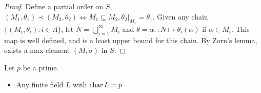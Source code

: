 \begin{theorem}
\begin{lemma}
\begin{proof}
      Define a partial order on $S$, $(M_1, \theta_1) \prec (M_2, \theta_2) \iff M_1 \subseteq M_2, \theta_2 \big|_{M_1} = \theta_1$.
      Given any chain $\{(M_i, \theta_i) : i \in \Lambda \}$, let $N = \bigcup_{i = 1}^\infty M_i$ and
      $\theta = \alpha :: N \mapsto \theta_i(\alpha)$ if $\alpha \in M_i$. This map is well defined, and is
      a  least upper bound for this chain. By Zorn's lemma, exists a max element $(M, \sigma)$ in $S$.
    \end{proof}
  \end{lemma}

  \begin{example}
    Let $p$ be a prime.
    \begin{itemize}
      \item Any finite field $L$ with $\operatorname{char} L = p$
    \end{itemize}
  \end{example}
\end{theorem}

